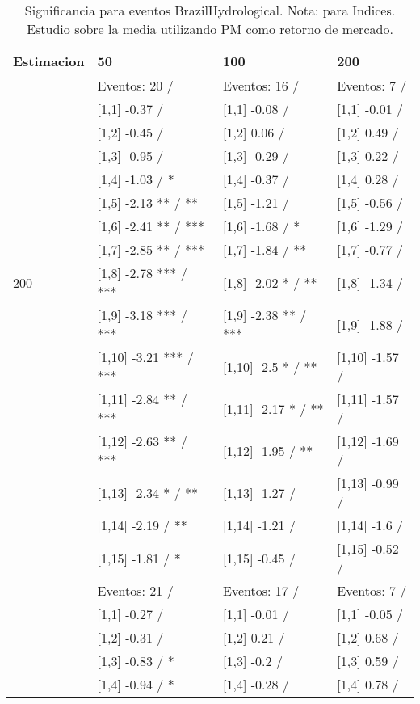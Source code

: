 \begin{table}

\caption{Significancia para eventos BrazilHydrological. Nota: para Indices. Estudio sobre la media utilizando PM como retorno de mercado.}
\centering
\begin{tabular}[t]{llll}
\toprule
Estimacion & 50 & 100 & 200\\
\midrule
 & Eventos:  20 / & Eventos:  16 / & Eventos:  7 /\\
 & {}[1,1] -0.37  / & {}[1,1] -0.08  / & {}[1,1] -0.01  /\\
 & {}[1,2] -0.45  / & {}[1,2] 0.06  / & {}[1,2] 0.49  /\\
 & {}[1,3] -0.95  / & {}[1,3] -0.29  / & {}[1,3] 0.22  /\\
 & {}[1,4] -1.03  / * & {}[1,4] -0.37  / & {}[1,4] 0.28  /\\
\addlinespace
 & {}[1,5] -2.13 ** / ** & {}[1,5] -1.21  / & {}[1,5] -0.56  /\\
 & {}[1,6] -2.41 ** / *** & {}[1,6] -1.68  / * & {}[1,6] -1.29  /\\
 & {}[1,7] -2.85 ** / *** & {}[1,7] -1.84  / ** & {}[1,7] -0.77  /\\
200 & {}[1,8] -2.78 *** / *** & {}[1,8] -2.02 * / ** & {}[1,8] -1.34  /\\
 & {}[1,9] -3.18 *** / *** & {}[1,9] -2.38 ** / *** & {}[1,9] -1.88  /\\
\addlinespace
 & {}[1,10] -3.21 *** / *** & {}[1,10] -2.5 * / ** & {}[1,10] -1.57  /\\
 & {}[1,11] -2.84 ** / *** & {}[1,11] -2.17 * / ** & {}[1,11] -1.57  /\\
 & {}[1,12] -2.63 ** / *** & {}[1,12] -1.95  / ** & {}[1,12] -1.69  /\\
 & {}[1,13] -2.34 * / ** & {}[1,13] -1.27  / & {}[1,13] -0.99  /\\
 & {}[1,14] -2.19  / ** & {}[1,14] -1.21  / & {}[1,14] -1.6  /\\
\addlinespace
 & {}[1,15] -1.81  / * & {}[1,15] -0.45  / & {}[1,15] -0.52  /\\
 & Eventos:  21 / & Eventos:  17 / & Eventos:  7 /\\
 & {}[1,1] -0.27  / & {}[1,1] -0.01  / & {}[1,1] -0.05  /\\
 & {}[1,2] -0.31  / & {}[1,2] 0.21  / & {}[1,2] 0.68  /\\
 & {}[1,3] -0.83  / * & {}[1,3] -0.2  / & {}[1,3] 0.59  /\\
\addlinespace
 & {}[1,4] -0.94  / * & {}[1,4] -0.28  / & {}[1,4] 0.78  /\\

\end{tabular}
\end{table}
